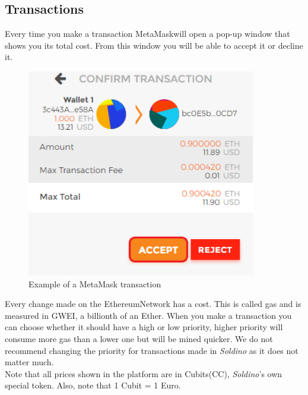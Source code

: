 	\subsection{Transactions}
	Every time you make a transaction MetaMask\glosp will open a pop-up window that 
	shows you its total cost.
	From this window you will be able to accept it or decline it.\\
	\begin{figure}[H]
		\includegraphics[width=10cm]{res/images/metamask_transaction.png}
		\centering
		\caption{Example of a MetaMask transaction}
	\end{figure}
	\noindent 
	Every change made on the Ethereum\glosp Network has a cost. This is called gas 
	and is measured in GWEI, a billionth of an Ether\glo. When you make a 
	transaction you can choose whether it should have a high or low priority, 
	higher priority will consume more gas than a lower one but will be mined 
	quicker. We do not recommend changing the priority for transactions made 
	in \textit{Soldino} as it does not matter much.\\
	Note that all prices shown in the platform are in Cubits\glosp (CC\glo), 
	\textit{Soldino}'s own special token. Also, note that 1 Cubit = 1 Euro.
